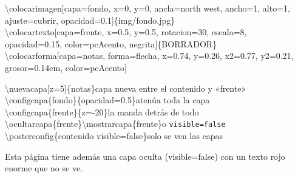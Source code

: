 \documentclass{article}
\newcommand{\bs}{\textbackslash}
\newcommand{\cod}[1]{{\ttfamily\tam{0.8}#1}}  %
\begin{document}
\begin{fila}[columnas=5, alto=242mm]
\begin{columna}[abarca=3, distribucion=arriba]
\begin{caja}[titulo={Elementos con posición absoluta}]
      \begin{codigoej}
        \bs colocarimagen[capa=fondo, x=0, y=0, ancla=north west, ancho=1, alto=1,\\
        \hspace*{2em}ajuste=cubrir, opacidad=0.1]\{img/fondo.jpg\}\\
        \bs colocartexto[capa=frente, x=0.5, y=0.5, rotacion=30, escala=8,\\
        \hspace*{2em}opacidad=0.15, color=pcAcento, negrita]\{BORRADOR\}\\
        \bs colocarforma[capa=notas, forma=flecha, x=0.74, y=0.26, x2=0.77, y2=0.21,\\
        \hspace*{2em}grosor=0.14em, color=pcAcento]
      \end{codigoej}
    \end{caja}
    \begin{caja}[titulo={Crear, ordenar, atenuar y ocultar capas}]
      \begin{codigoej}
        \bs nuevacapa[z=5]\{notas\}\hfill{\normalfont\color{pcTenue}capa nueva entre el contenido y «frente»}\\
        \bs configcapa\{fondo\}\{opacidad=0.5\}\hfill{\normalfont\color{pcTenue}atenúa toda la capa}\\
        \bs configcapa\{frente\}\{z=-20\}\hfill{\normalfont\color{pcTenue}la manda detrás de todo}\\
        \bs ocultarcapa\{frente\}\quad\bs mostrarcapa\{frente\}\hfill{\normalfont\color{pcTenue}o \texttt{visible=false}}\\
        \bs posterconfig\{contenido visible=false\}\hfill{\normalfont\color{pcTenue}solo se ven las capas}
      \end{codigoej}
      Esta página tiene además una capa \cod{oculta} (\cod{visible=false}) con un texto rojo enorme que no se ve.
    \end{caja}
  \end{columna}
\end{fila}
\end{document}
